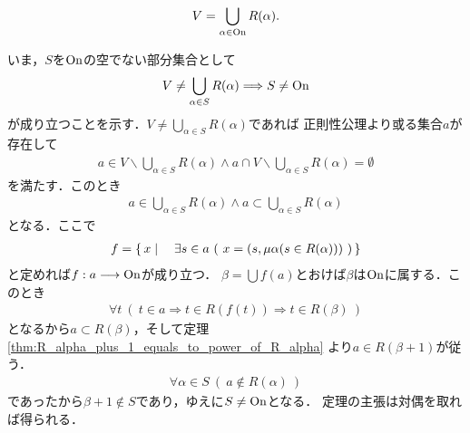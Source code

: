 	\begin{screen}
		\begin{thm}
			\begin{align}
				V = \bigcup_{\alpha \in \mathrm{On}} R(\alpha).
			\end{align}
		\end{thm}
	\end{screen}
	
	\begin{prf}
		いま，$S$を$\mathrm{On}$の空でない部分集合として
		\begin{align}
			V \neq \bigcup_{\alpha \in S} R(\alpha)
			\Longrightarrow S \neq \mathrm{On}
		\end{align}
		が成り立つことを示す．$V \neq \bigcup_{\alpha \in S} R(\alpha)$であれば
		正則性公理より或る集合$a$が存在して
		\begin{align}
			a \in V \backslash \bigcup_{\alpha \in S} R(\alpha)
			\wedge a \cap V \backslash \bigcup_{\alpha \in S} R(\alpha) = \emptyset
		\end{align}
		を満たす．このとき
		\begin{align}
			a \in \bigcup_{\alpha \in S} R(\alpha) \wedge a \subset \bigcup_{\alpha \in S} R(\alpha)
		\end{align}
		となる．ここで
		\begin{align}
			f = \left\{\, x \mid \quad \exists s \in a\ (\ x = (s,\mu \alpha (s \in R(\alpha)))\ )\, \right\}
		\end{align}
		と定めれば$f:a \longrightarrow \mathrm{On}$が成り立つ．
		$\beta = \bigcup f(a)$とおけば$\beta$は$\mathrm{On}$に属する．このとき
		\begin{align}
			\forall t\ (\ t \in a \Longrightarrow t \in R(f(t))
			\Longrightarrow t \in R(\beta)\ )
		\end{align}
		となるから$a \subset R(\beta)$，そして定理\ref{thm:R_alpha_plus_1_equals_to_power_of_R_alpha}
		より$a \in R(\beta + 1)$が従う．
		\begin{align}
			\forall \alpha \in S\ (\ a \notin R(\alpha)\ )
		\end{align}
		であったから$\beta + 1 \notin S$であり，ゆえに$S \neq \mathrm{On}$となる．
		定理の主張は対偶を取れば得られる．
		\QED
	\end{prf}
	
	
